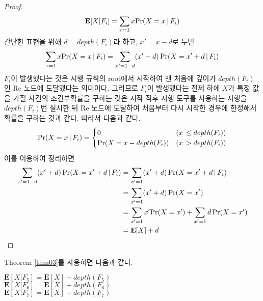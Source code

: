 \documentclass[11pt]{article}
\begin{document}
\begin{proof}
\[\textnormal{\textbf{E}}[X|F_{i}] = \sum_{x=1} x \textnormal{Pr}(X = x\,|\,F_{i})\]
간단한 표현을 위해 $d = depth(F_{i})$라 하고, $x'=x-d$로 두면
\[\sum_{x=1} x \textnormal{Pr}(X = x\,|\,F_{i}) = \sum_{x'=1-d} (x'+d)\,\textnormal{Pr}(X = x'+d\,|\,F_{i})\]
$F_{i}$이 발생했다는 것은 시행 규칙의 root에서 시작하여 맨 처음에 깊이가 $depth(F_{i})$인 Re 노드에 도달했다는 의미이다. 그러므로 $F_{i}$이 발생했다는 전제 하에 $X$가 특정 값을 가질 사건의 조건부확률을 구하는 것은 시작 직후 시행 도구를 사용하는 시행을 $depth(F_{i})$번 실시한 뒤 Re 노드에 도달하여 처음부터 다시 시작한 경우에 한정해서 확률을 구하는 것과 같다. 따라서 다음과 같다.
\[
\textnormal{Pr}(X = x\,|\,F_{i}) =
\begin{cases}
0 & (x\,\le depth(F_{i}))\\
\textnormal{Pr}(X = x-depth(F_{i})) & (x\,> depth(F_{i}))
\end{cases}
\]
이를 이용하여 정리하면
\[
\begin{split}
\sum_{x'=1-d} (x'+d)\,\textnormal{Pr}(X = x'+d\,|\,F_{i}) & = \sum_{x'=1} (x'+d)\,\textnormal{Pr}(X = x'+d\,|\,F_{i})\\
& = \sum_{x'=1} (x'+d)\,\textnormal{Pr}(X = x')\\
& = \sum_{x'=1} x'\textnormal{Pr}(X = x') + \sum_{x'=1} d\,\textnormal{Pr}(X = x')\\
& = \textnormal{\textbf{E}}[X]+d
\end{split}
\]
\end{proof}
\noindent Theorem \ref{thm03}를 사용하면 다음과 같다.

\singlespacing
\begin{center}
$\textbf{E}[X|F_{5}]=\textbf{E}[X]+depth(F_{5})$\\
$\textbf{E}[X|F_{6}]=\textbf{E}[X]+depth(F_{6})$\\
$\textbf{E}[X|F_{7}]=\textbf{E}[X]+depth(F_{7})$\\
\end{center}
\doublespacing
\end{document}
